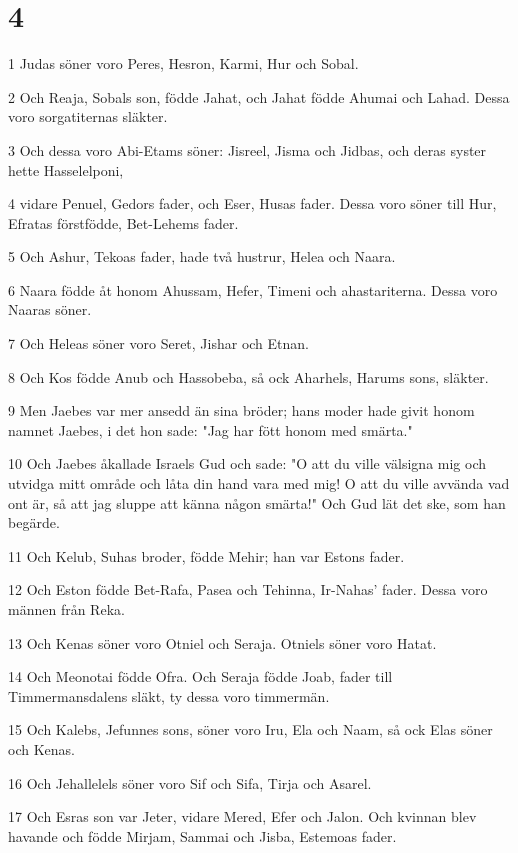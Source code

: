 \chapter{4}

\par 1 Judas söner voro Peres, Hesron, Karmi, Hur och Sobal.
\par 2 Och Reaja, Sobals son, födde Jahat, och Jahat födde Ahumai och Lahad. Dessa voro sorgatiternas släkter.
\par 3 Och dessa voro Abi-Etams söner: Jisreel, Jisma och Jidbas, och deras syster hette Hasselelponi,
\par 4 vidare Penuel, Gedors fader, och Eser, Husas fader. Dessa voro söner till Hur, Efratas förstfödde, Bet-Lehems fader.
\par 5 Och Ashur, Tekoas fader, hade två hustrur, Helea och Naara.
\par 6 Naara födde åt honom Ahussam, Hefer, Timeni och ahastariterna. Dessa voro Naaras söner.
\par 7 Och Heleas söner voro Seret, Jishar och Etnan.
\par 8 Och Kos födde Anub och Hassobeba, så ock Aharhels, Harums sons, släkter.
\par 9 Men Jaebes var mer ansedd än sina bröder; hans moder hade givit honom namnet Jaebes, i det hon sade: "Jag har fött honom med smärta."
\par 10 Och Jaebes åkallade Israels Gud och sade: "O att du ville välsigna mig och utvidga mitt område och låta din hand vara med mig! O att du ville avvända vad ont är, så att jag sluppe att känna någon smärta!" Och Gud lät det ske, som han begärde.
\par 11 Och Kelub, Suhas broder, födde Mehir; han var Estons fader.
\par 12 Och Eston födde Bet-Rafa, Pasea och Tehinna, Ir-Nahas' fader. Dessa voro männen från Reka.
\par 13 Och Kenas söner voro Otniel och Seraja. Otniels söner voro Hatat.
\par 14 Och Meonotai födde Ofra. Och Seraja födde Joab, fader till Timmermansdalens släkt, ty dessa voro timmermän.
\par 15 Och Kalebs, Jefunnes sons, söner voro Iru, Ela och Naam, så ock Elas söner och Kenas.
\par 16 Och Jehallelels söner voro Sif och Sifa, Tirja och Asarel.
\par 17 Och Esras son var Jeter, vidare Mered, Efer och Jalon. Och kvinnan blev havande och födde Mirjam, Sammai och Jisba, Estemoas fader.
